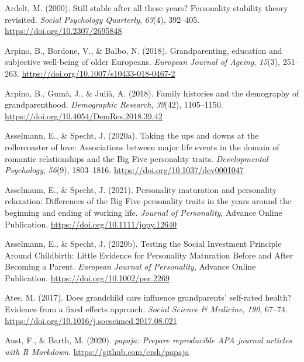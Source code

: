 \documentclass[
  english,
  man, noextraspace,floatsintext]{apa7}
\begin{document}
\leavevmode\hypertarget{ref-ardeltStillStableAll2000}{}%
Ardelt, M. (2000). Still stable after all these years? Personality stability theory revisited. \emph{Social Psychology Quarterly}, \emph{63}(4), 392--405. \url{https://doi.org/10.2307/2695848}

\leavevmode\hypertarget{ref-arpinoGrandparentingEducationSubjective2018}{}%
Arpino, B., Bordone, V., \& Balbo, N. (2018). Grandparenting, education and subjective well-being of older Europeans. \emph{European Journal of Ageing}, \emph{15}(3), 251--263. \url{https://doi.org/10.1007/s10433-018-0467-2}

\leavevmode\hypertarget{ref-arpinoFamilyHistoriesDemography2018}{}%
Arpino, B., Gumà, J., \& Julià, A. (2018). Family histories and the demography of grandparenthood. \emph{Demographic Research}, \emph{39}(42), 1105--1150. \url{https://doi.org/10.4054/DemRes.2018.39.42}

\leavevmode\hypertarget{ref-asselmannTakingUpsDowns2020}{}%
Asselmann, E., \& Specht, J. (2020a). Taking the ups and downs at the rollercoaster of love: Associations between major life events in the domain of romantic relationships and the Big Five personality traits. \emph{Developmental Psychology}, \emph{56}(9), 1803--1816. \url{https://doi.org/10.1037/dev0001047}

\leavevmode\hypertarget{ref-asselmannPersonalityMaturationPersonality2021}{}%
Asselmann, E., \& Specht, J. (2021). Personality maturation and personality relaxation: Differences of the Big Five personality traits in the years around the beginning and ending of working life. \emph{Journal of Personality}, Advance Online Publication. \url{https://doi.org/10.1111/jopy.12640}

\leavevmode\hypertarget{ref-asselmannTestingSocialInvestment2020}{}%
Asselmann, E., \& Specht, J. (2020b). Testing the Social Investment Principle Around Childbirth: Little Evidence for Personality Maturation Before and After Becoming a Parent. \emph{European Journal of Personality}, Advance Online Publication. \url{https://doi.org/10.1002/per.2269}

\leavevmode\hypertarget{ref-atesDoesGrandchildCare2017}{}%
Ates, M. (2017). Does grandchild care influence grandparents' self-rated health? Evidence from a fixed effects approach. \emph{Social Science \& Medicine}, \emph{190}, 67--74. \url{https://doi.org/10.1016/j.socscimed.2017.08.021}

\leavevmode\hypertarget{ref-R-papaja}{}%
Aust, F., \& Barth, M. (2020). \emph{papaja: Prepare reproducible APA journal articles with R Markdown}. \url{https://github.com/crsh/papaja}
\end{document}
